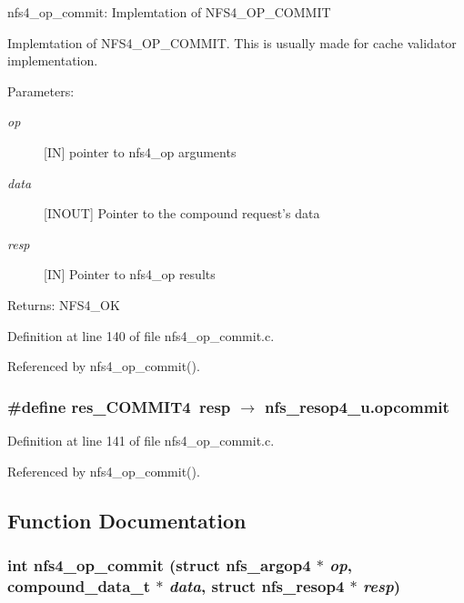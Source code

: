 nfs4\_\-op\_\-commit: Implemtation of NFS4\_\-OP\_\-COMMIT

Implemtation of NFS4\_\-OP\_\-COMMIT. This is usually made for cache validator implementation.

\begin{Desc}
\item[Parameters:]
\begin{description}
\item[{\em op}][IN] pointer to nfs4\_\-op arguments \item[{\em data}][INOUT] Pointer to the compound request's data \item[{\em resp}][IN] Pointer to nfs4\_\-op results\end{description}
\end{Desc}
\begin{Desc}
\item[Returns:]NFS4\_\-OK \end{Desc}


Definition at line 140 of file nfs4\_\-op\_\-commit.c.

Referenced by nfs4\_\-op\_\-commit().
\subsubsection{\setlength{\rightskip}{0pt plus 5cm}\#define res\_\-COMMIT4\ resp $\rightarrow$ nfs\_\-resop4\_\-u.opcommit}\label{nfs4__op__commit_8c_a1}




Definition at line 141 of file nfs4\_\-op\_\-commit.c.

Referenced by nfs4\_\-op\_\-commit().

\subsection{Function Documentation}
\subsubsection{\setlength{\rightskip}{0pt plus 5cm}int nfs4\_\-op\_\-commit (struct nfs\_\-argop4 $\ast$ {\em op}, compound\_\-data\_\-t $\ast$ {\em data}, struct nfs\_\-resop4 $\ast$ {\em resp})}\label{nfs4__op__commit_8c_a2}




